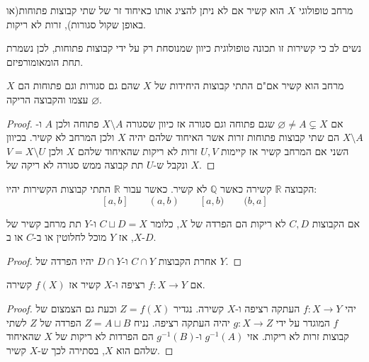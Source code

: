 \documentclass{tstextbook}
\begin{document}
\begin{definition}
מרחב טופולוגי \(X\) הוא קשיר אם לא ניתן להציג אותו כאיחוד זר של שתי קבוצות פתוחות(או באופן שקול סגורות), זרות לא ריקות.

\end{definition}
\begin{remark}
נשים לב כי קשירות זו תכונה טופולוגית כיוון שמנוסחת רק על ידי קבוצות פתוחות, לכן נשמרת תחת הומאומורפיזם.

\end{remark}
\begin{proposition}
מרחב הוא קשיר אם"ם התתי קבוצות היחידות של \(X\) שהם גם סגורות וגם פתוחות הם \(X\) עצמו והקבוצה הריקה \(\varnothing\).

\end{proposition}
\begin{proof}
אם \(\varnothing\neq A\subsetneq X\) שגם פתוחה וגם סגורה אז כיוון שסגורה \(X \setminus A\) פתוחה ולכן \(A\) ו-\(X\setminus A\) הם שתי קבוצות פתוחות זרות אשר האיחוד שלהם יהיה \(X\) ולכן המרחב לא קשיר. בכיוון השני אם המרחב קשיר אז קיימות \(U,V\) זרות לא ריקות שהאיחוד שלהם \(X\) ולכן \(V=X\setminus U\) ונקבל ש-\(U\) תת קבוצה ממש סגורה לא ריקה של \(X\).

\end{proof}
\begin{example}
הקבוצה \(\mathbb{R}\) קשירה כאשר \(\mathbb{Q}\) לא קשיר. כאשר עבור \(\mathbb{R}\) התתי קבוצות הקשירות יהיו:
$$[a,b]\qquad (a,b)\qquad [a,b)\qquad (b,a]$$

\end{example}
\begin{lemma}
אם הקבוצות \(C,D\) לא ריקות הם הפרדה של \(X\), כלומר \(C\sqcup D = X\) ו-\(Y\) תת מרחב קשיר של \(X\), אז \(Y\) מוכל לחלוטין או ב-\(C\) או ב-\(D\).

\end{lemma}
\begin{proof}
אחרת הקבוצות \(C\cap Y\) ו-\(D\cap Y\) יהיו הפרדה של \(Y\).

\end{proof}
\begin{proposition}
אם \(f:X\to Y\) רציפה ו-\(X\) קשיר אז \(f(X)\) קשירה.

\end{proposition}
\begin{proof}
יהי \(f:X\to Y\) העתקה רציפה ו-\(X\) קשירה. נגדיר \(Z=f(X)\) וכעת גם הצמצום של \(f\) המוגדר על ידי \(g:X\to Z\) יהיה העתקה רציפה. נניח \(Z=A\sqcup B\) הפרדה של \(Z\) לשתי קבוצות זרות לא ריקות. אזי \(g^{-1}(A)\) ו-\(g^{-1}(B)\) הם הפרדות לא ריקות של \(X\) שהאיחוד שלהם הוא \(X\), בסתירה לכך ש-\(X\) קשיר.

\end{proof}
\end{document}
